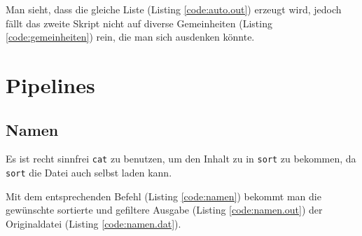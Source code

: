 

Man sieht, dass die gleiche Liste (Listing \ref{code:auto.out}) erzeugt wird, jedoch fällt das zweite Skript nicht auf diverse Gemeinheiten (Listing \ref{code:gemeinheiten}) rein, die man sich ausdenken könnte.


\section{Pipelines}
\subsection{Namen}

Es ist recht sinnfrei \texttt{cat} zu benutzen, um den Inhalt zu in \texttt{sort} zu bekommen, da \texttt{sort} die Datei auch selbst laden kann.

Mit dem entsprechenden Befehl (Listing \ref{code:namen}) bekommt man die gewünschte sortierte und gefiltere Ausgabe (Listing \ref{code:namen.out}) der Originaldatei (Listing \ref{code:namen.dat}).

